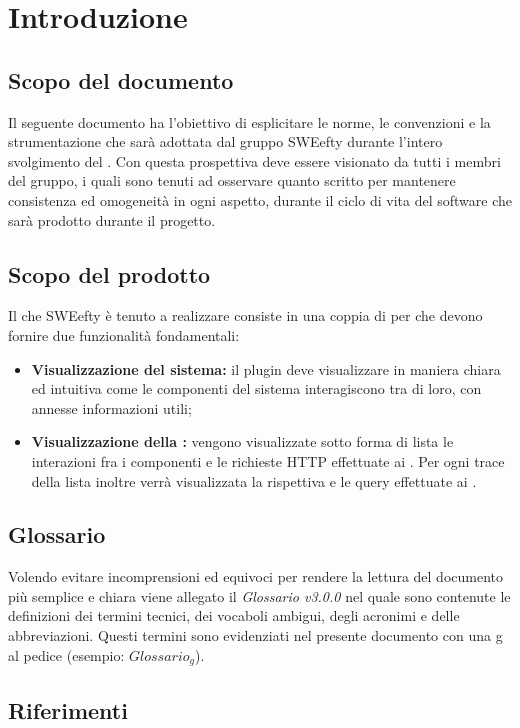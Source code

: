 \section{Introduzione}
\label{sec:intro}
\subsection{Scopo del documento}
Il seguente documento ha l'obiettivo di esplicitare le norme, le convenzioni e la strumentazione che sarà adottata dal gruppo SWEefty durante l'intero svolgimento del . Con questa prospettiva deve essere visionato da tutti i membri del gruppo, i quali sono tenuti ad osservare quanto scritto per mantenere consistenza ed omogeneità in ogni aspetto, durante il ciclo di vita del software che sarà prodotto durante il progetto.
\subsection{Scopo del prodotto}
	Il  che SWEefty è tenuto a realizzare consiste in una coppia di  per  che devono fornire due funzionalità fondamentali:
	\begin{itemize}
		\item \textbf{Visualizzazione  del sistema:} il plugin deve visualizzare in maniera chiara ed intuitiva come le componenti del sistema interagiscono tra di loro, con annesse informazioni utili;
		\item \textbf{Visualizzazione della :} vengono visualizzate sotto forma di lista le interazioni fra i componenti e le richieste HTTP effettuate ai . Per ogni trace della lista inoltre verrà visualizzata la rispettiva  e le query effettuate ai .
	\end{itemize}

\subsection{Glossario}
	Volendo evitare incomprensioni  ed equivoci per rendere la lettura del documento più semplice e chiara viene allegato il \emph{Glossario v3.0.0} nel quale sono contenute le definizioni dei termini tecnici, dei vocaboli ambigui, degli acronimi e delle abbreviazioni. Questi termini sono evidenziati nel presente documento con una g al pedice (esempio: $Glossario_{g}$).

\subsection{Riferimenti}
